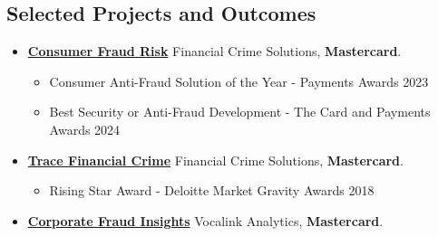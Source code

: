 \documentclass[line, overlapped]{res}
\begin{document}
\begin{resume}
\section{Selected Projects and Outcomes}

\begin{itemize}
\item
	\href{https://www.bloomberg.com/news/articles/2023-07-05/mastercard-s-ai-tool-helps-nine-british-banks-tackle-scams}{\textbf{Consumer Fraud Risk}} Financial Crime Solutions, \textbf{Mastercard}.
  \begin{itemize}
  \item
    Consumer Anti-Fraud Solution of the Year - Payments Awards 2023
  \item
    Best Security or Anti-Fraud Development - The Card and Payments
    Awards 2024
  \end{itemize}
\item
	\href{https://www.vocalink.com/news-insights/case-studies/case-study-mits/}{\textbf{Trace Financial Crime}} Financial Crime Solutions, \textbf{Mastercard}.

  \begin{itemize}
  \item
    Rising Star Award - Deloitte Market Gravity Awards 2018
  \end{itemize}
\item
	\href{https://www.thetimes.co.uk/article/rbs-system-pushes-back-against-invoice-fraudsters-88h92l5ml}{\textbf{Corporate Fraud Insights}} Vocalink Analytics, \textbf{Mastercard}.


\end{itemize}
\end{resume}
\end{document}
